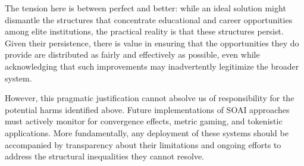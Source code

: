 
The tension here is between perfect and better: while an ideal solution might dismantle the structures that concentrate educational and career opportunities among elite institutions, the practical reality is that these structures persist. Given their persistence, there is value in ensuring that the opportunities they do provide are distributed as fairly and effectively as possible, even while acknowledging that such improvements may inadvertently legitimize the broader system.

However, this pragmatic justification cannot absolve us of responsibility for the potential harms identified above. Future implementations of SOAI approaches must actively monitor for convergence effects, metric gaming, and tokenistic applications. More fundamentally, any deployment of these systems should be accompanied by transparency about their limitations and ongoing efforts to address the structural inequalities they cannot resolve.

